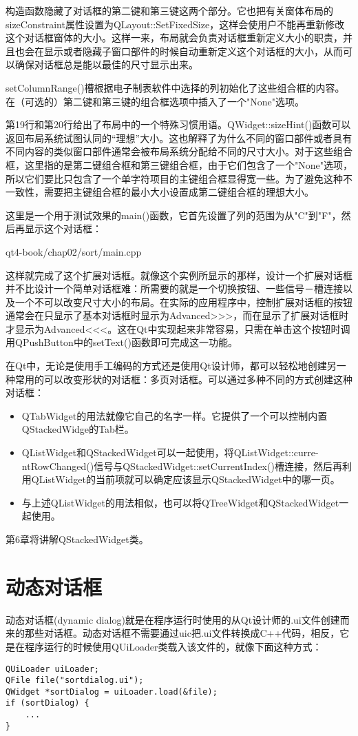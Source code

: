 \documentclass[11pt,oneside]{book}
\begin{document}
\begin{common-format}
构造函数隐藏了对话框的第二键和第三键这两个部分。它也把有关窗体布局的sizeConstraint属性设置为QLayout::SetFixedSize，这样会使用户不能再重新修改这个对话框窗体的大小。这样一来，布局就会负责对话框重新定义大小的职责，并且也会在显示或者隐藏子窗口部件的时候自动重新定义这个对话框的大小，从而可以确保对话框总是能以最佳的尺寸显示出来。

setColumnRange()槽根据电子制表软件中选择的列初始化了这些组合框的内容。在（可选的）第二键和第三键的组合框选项中插入了一个"None"选项。

第19行和第20行给出了布局中的一个特殊习惯用语。QWidget::sizeHint()函数可以返回布局系统试图认同的“理想”大小。这也解释了为什么不同的窗口部件或者具有不同内容的类似窗口部件通常会被布局系统分配给不同的尺寸大小。对于这些组合框，这里指的是第二键组合框和第三键组合框，由于它们包含了一个"None"选项，所以它们要比只包含了一个单字符项目的主键组合框显得宽一些。为了避免这种不一致性，需要把主键组合框的最小大小设置成第二键组合框的理想大小。

这里是一个用于测试效果的main()函数，它首先设置了列的范围为从"C"到"F"，然后再显示这个对话框：
\begin{cppinput}{qt4-book/chap02/sort/main.cpp}
\end{cppinput}

这样就完成了这个扩展对话框。就像这个实例所显示的那样，设计一个扩展对话框并不比设计一个简单对话框难：所需要的就是一个切换按钮、一些信号－槽连接以及一个不可以改变尺寸大小的布局。在实际的应用程序中，控制扩展对话框的按钮通常会在只显示了基本对话框时显示为Advanced>>>，而在显示了扩展对话框时才显示为Advanced<<<。这在Qt中实现起来非常容易，只需在单击这个按钮时调用QPushButton中的setText()函数即可完成这一功能。

在Qt中，无论是使用手工编码的方式还是使用Qt设计师，都可以轻松地创建另一种常用的可以改变形状的对话框：多页对话框。可以通过多种不同的方式创建这种对话框：
\begin{itemize}
\item QTabWidget的用法就像它自己的名字一样。它提供了一个可以控制内置QStackedWidge的Tab栏。
\item QListWidget和QStackedWidget可以一起使用，将QListWidget::curre-ntRowChanged()信号与QStackedWidget::setCurrentIndex()槽连接，然后再利用QListWidget的当前项就可以确定应该显示QStackedWidget中的哪一页。
\item 与上述QListWidget的用法相似，也可以将QTreeWidget和QStackedWidget一起使用。
\end{itemize}

第6章将讲解QStackedWidget类。

\section{动态对话框}
动态对话框(dynamic dialog)就是在程序运行时使用的从Qt设计师的.ui文件创建而来的那些对话框。动态对话框不需要通过uic把.ui文件转换成C++代码，相反，它是在程序运行的时候使用QUiLoader类载入该文件的，就像下面这种方式：
\begin{Verbatim}
QUiLoader uiLoader;
QFile file("sortdialog.ui");
QWidget *sortDialog = uiLoader.load(&file);
if (sortDialog) {
    ...
}
\end{Verbatim}


\end{common-format}
\end{document}

